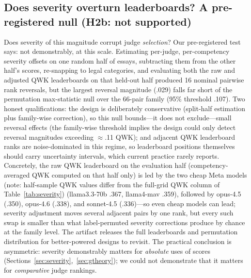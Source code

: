 \documentclass[fleqn,10pt]{JLA_article}
\begin{document}
\subsection{Does severity overturn leaderboards? A pre-registered null (H2b: not supported)}
\label{sec:h2b}
Does severity of this magnitude corrupt judge \emph{selection}? Our pre-registered test says: not demonstrably, at this scale. Estimating per-judge, per-competency severity offsets on one random half of essays, subtracting them from the other half's scores, re-snapping to legal categories, and evaluating both the raw and adjusted QWK leaderboards on that held-out half produced 16 nominal pairwise rank reversals, but the largest reversal magnitude
(.029) falls far short of the permutation max-statistic null over the 66-pair family
(95\% threshold .107). Two honest qualifications: the design is deliberately conservative
(split-half estimation plus family-wise correction), so this null bounds---it does not exclude---small reversal effects (the family-wise threshold implies the design could only detect reversal magnitudes exceeding $\approx$.11 QWK); and adjacent QWK leaderboard ranks are noise-dominated in this
regime, so leaderboard positions themselves should carry uncertainty intervals, which current
practice rarely reports. Concretely, the raw QWK leaderboard on the evaluation half (competency-averaged QWK computed on that half only) is led by the two cheap Meta models (note: half-sample QWK values differ from the full-grid QWK column of Table~\ref{tab:severity}) (llama3.3-70b .367, llama4-mav .359), followed by opus-4.5 (.350), opus-4.6 (.338), and sonnet-4.5 (.336)---so even cheap models can lead; severity adjustment moves several adjacent pairs by one rank, but every such swap is smaller than what label-permuted severity corrections produce by chance at the family level. The artifact releases the full leaderboards and permutation distribution for better-powered designs to revisit. The practical conclusion is asymmetric: severity demonstrably matters
for \emph{absolute} uses of scores (Sections~\ref{sec:severity},~\ref{sec:gtheory}); we could not
demonstrate that it matters for \emph{comparative} judge rankings.
\end{document}
